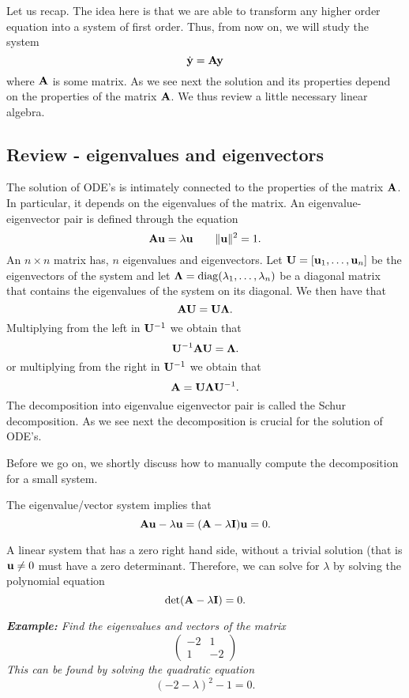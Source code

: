 \documentclass[12pt,legal]{article}
\newcommand{\bfA}{{\bf A}}
\newcommand{\bfI}{{\bf I}}
\newcommand{\bfU}{{\bf U}}
\newcommand{\bfy}{{\bf y}}
\newcommand{\bfu}{{\bf u}}
\newcommand{\bfLambda}{{\boldsymbol \Lambda}}
\begin{document}
\bigskip

Let us recap. The idea here is that we are able to transform any higher order equation into a system of first order. Thus, from now on, we will study the system
$$ \dot{\bfy} = {\bf A} \bfy $$
where $\bfA$ is some matrix.
As we see next the solution and its properties depend on the properties of the matrix $\bfA$. We thus review a little necessary linear algebra.

\subsection{Review - eigenvalues and eigenvectors }

The solution of ODE's is intimately  connected to the properties of the matrix $\bfA$. In particular, it depends on the eigenvalues of the matrix. An eigenvalue-eigenvector pair is defined through the equation
$$ \bfA \bfu = \lambda \bfu \quad \quad \|\bfu\|^2 = 1. $$
An $n\times n$ matrix has, $n$ eigenvalues and eigenvectors.
Let $\bfU = [\bfu_1, \dots,\bfu_n]$ be the eigenvectors of the system
and let $\bfLambda = {\rm diag}(\lambda_1,\ldots,\lambda_n)$ be a diagonal matrix that contains the eigenvalues of the system on its diagonal.
We then have that
$$ \bfA \bfU =  \bfU \bfLambda. $$
Multiplying from the left in $\bfU^{-1}$ we obtain that
$$ \bfU^{-1} \bfA \bfU =  \bfLambda. $$
or multiplying from the right in $\bfU^{-1}$ we obtain that
$$ \bfA = \bfU \bfLambda \bfU^{-1}.$$
The decomposition into eigenvalue eigenvector pair is called the Schur decomposition. As we see next the decomposition is crucial for the solution
of ODE's.

\bigskip

Before we go on, we shortly discuss how to manually compute the decomposition for a small system.

The eigenvalue/vector system implies that
$$ \bfA \bfu - \lambda \bfu = ( \bfA  - \lambda \bfI) \bfu = 0. $$

A linear system that has a zero right hand side, without a trivial solution (that is $\bfu \not=0$ must have a zero determinant. Therefore, we can solve for $\lambda$ by solving the polynomial equation
$$ {\rm det}  ( \bfA  - \lambda \bfI)  = 0. $$

\bigskip

{\em {\bf {Example:}}
Find the eigenvalues and vectors of the matrix 
$$ \begin{pmatrix} -2   & 1  \\ 1  & -2 \end{pmatrix} $$
This can be found by solving the quadratic equation
$$ (-2-\lambda)^2 -1 = 0. $$}
\end{document}
